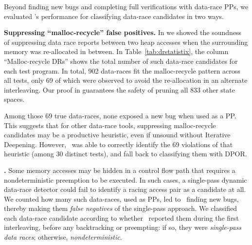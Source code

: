 Beyond finding new bugs and completing full verifications with data-race PPs, we evaluated \quicksand's performance for classifying data-race candidates in two ways.

{\bf Suppressing ``malloc-recycle'' false positives.}
In \sect{\ref{sec:recycle}} we showed the soundness of suppressing data race reports between two heap accesses when the surrounding memory was re-allocated in between.
In Table~\ref{tab:drstatistix}, the column ``Malloc-recycle DRs'' shows the total number of such data-race candidates for each test program.
In total, 902 data-races fit the malloc-recycle pattern across all tests,
only 69 of which were observed to avoid the re-allocation in an alternate interleaving.
Our proof in \sect{\ref{sec:recycle}} guarantees the safety of pruning all 833 other state spaces.

Among those 69 true data-races, %
none exposed a new bug when used as a PP.
This suggests that for other data-race tools,
suppressing malloc-recycle candidates may be a productive heuristic,
even if unsound without Iterative Deepening.
However, \quicksand~was able to correctly identify the 69 violations of that heuristic (among 30 distinct tests),
and fall back to classifying them with DPOR.


{\bf {}.}
Some memory accesses may be hidden in a control flow path that requires a nondeterministic preemption to be executed.
In such cases, a single-pass dynamic data-race detector
could fail
to identify a racing access pair as a candidate at all. %
%
We counted how many such data-races, used as PPs, led to \quicksand~finding new bugs,
thereby making them {\em false negatives} of the single-pass approach.
We classified each data-race candidate according to whether \landslide~reported them during the first interleaving,
before any backtracking or preempting:
if so, they were {\em single-pass data races}; otherwise, {\em nondeterministic}.


